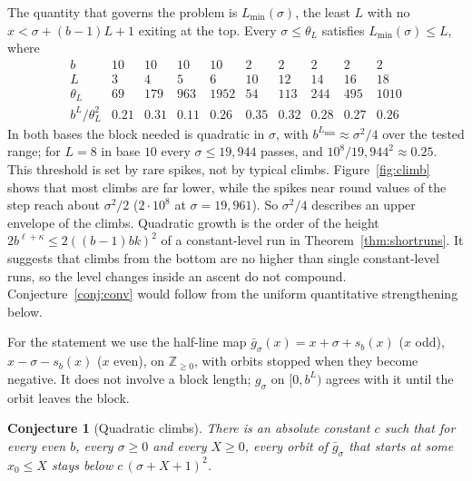 \documentclass[11pt]{article}
\newtheorem{conjecture}[theorem]{Conjecture}
\theoremstyle{definition}
\theoremstyle{remark}
\begin{document}
The quantity that governs the problem is $L_{\min}(\sigma)$, the least $L$
with no $x<\sigma+(b-1)L+1$ exiting at the top. Every $\sigma\le\theta_L$
satisfies $L_{\min}(\sigma)\le L$, where
\[
\begin{array}{c|cccc|ccccc}
b & 10&10&10&10 & 2&2&2&2&2\\
L & 3&4&5&6 & 10&12&14&16&18\\
\theta_L & 69&179&963&1952 & 54&113&244&495&1010\\
b^L/\theta_L^2 & 0.21&0.31&0.11&0.26 & 0.35&0.32&0.28&0.27&0.26
\end{array}
\]
In both bases the block needed is quadratic in $\sigma$, with
$b^{L_{\min}}\approx\sigma^2/4$ over the tested range; for $L=8$ in base $10$
every $\sigma\le19{,}944$ passes, and $10^8/19{,}944^2\approx0.25$. This
threshold is set by rare spikes, not by typical climbs. Figure~\ref{fig:climb}
shows that most climbs are far lower, while the spikes near round values of
the step reach about $\sigma^2/2$ ($2\cdot10^8$ at $\sigma=19{,}961$). So $\sigma^2/4$
describes an upper envelope of the climbs. Quadratic growth is the order of the height
$2b^{\ell+\kappa}\le2((b-1)bk)^2$ of a constant-level run in
Theorem~\ref{thm:shortruns}. It suggests that climbs from the bottom are no
higher than single constant-level runs, so the level changes inside an ascent
do not compound. Conjecture~\ref{conj:conv} would follow from the uniform
quantitative strengthening below.

For the statement we use the half-line map
$\bar g_\sigma(x)=x+\sigma+s_b(x)$ ($x$ odd), $x-\sigma-s_b(x)$ ($x$ even), on
$\mathbb Z_{\ge0}$, with orbits stopped when they become negative. It does not
involve a block length; $g_\sigma$ on $[0,b^L)$ agrees with it until the
orbit leaves the block.

\begin{conjecture}[Quadratic climbs]\label{conj:quad}
There is an absolute constant $c$ such that for every even $b$, every
$\sigma\ge0$ and every $X\ge0$, every orbit of $\bar g_\sigma$ that starts at
some $x_0\le X$ stays below $c\,(\sigma+X+1)^2$.
\end{conjecture}
\end{document}
